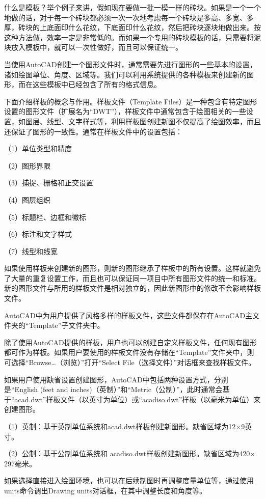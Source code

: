 什么是模板？举个例子来讲，假如现在要做一批一模一样的砖块。如果是一个一个地做的话，对于每一个砖块都必须一次一次地考虑每一个砖块是多高、多宽、多厚，砖块的上底面印什么花纹，下底面印什么花纹，然后把砖块逐块地做出来。按这种方法做，效率一定是非常低的。而如果一个专用的砖块模板的话，只需要将泥块放入模板中，就可以一次性做好，而且可以保证统一。

当使用AutoCAD创建一个图形文件时，通常需要先进行图形的一些基本的设置，诸如绘图单位、角度、区域等。我们可以利用系统提供的各种模板来创建新的图形，而在这些模板中已经包含了所有的格式信息。


下面介绍样板的概念与作用。样板文件（Template Files）是一种包含有特定图形设置的图形文件（扩展名为“DWT”），样板文件中通常包含于绘图相关的一些设置，如图层、线型、文字样式等，利用样板图创建新图不仅提高了绘图效率，而且还保证了图形的一致性。通常在样板文件中的设置包括：

（1）单位类型和精度

（2）图形界限

（3）捕捉、栅格和正交设置

（4）图层组织

（5）标题栏、边框和徽标

（6）标注和文字样式

（7）线型和线宽

如果使用样板来创建新的图形，则新的图形继承了样板中的所有设置。这样就避免了大量的重复设置工作，而且也可以保证同一项目中所有图形文件的统一和标准。新的图形文件与所用的样板文件是相对独立的，因此新图形中的修改不会影响样板文件。

AutoCAD中为用户提供了风格多样的样板文件，这些文件都保存在AutoCAD主文件夹的“Template”子文件夹中。

除了使用AutoCAD提供的样板，用户也可以创建自定义样板文件，任何现有图形都可作为样板。如果用户要使用的样板文件没有存储在“Template”文件夹中，则可选择“Browse…（浏览）”打开“Select File（选择文件）”对话框来查找样板文件。

如果用户使用缺省设置创建图形，AutoCAD中包括两种设置方式，分别是“English (feet and inches)（英制）”和“Metric（公制）”，此时通常会基于“acad.dwt”样板文件（以英寸为单位）或“acadiso.dwt”样板（以毫米为单位）来创建图形。

（1）英制：基于英制单位系统和acad.dwt样板创建新图形。缺省区域为12$\times$9英寸。

（2）公制：基于公制单位系统和 acadiso.dwt样板创建新图形。缺省区域为420$\times$297毫米。

如果选择直接进入绘图环境，也可以在后续制图时再调整度量单位等，通过使用units命令调出Drawing units对话框，在其中调整长度和角度等。




